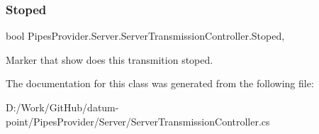 \subsubsection{\texorpdfstring{Stoped}{Stoped}}
{\footnotesize\ttfamily bool Pipes\+Provider.\+Server.\+Server\+Transmission\+Controller.\+Stoped\hspace{0.3cm}{\ttfamily [get]}, {}}



Marker that show does this transmition stoped. 



The documentation for this class was generated from the following file\+:\begin{DoxyCompactItemize}
\item 
D\+:/\+Work/\+Git\+Hub/datum-\/point/\+Pipes\+Provider/\+Server/Server\+Transmission\+Controller.\+cs\end{DoxyCompactItemize}
